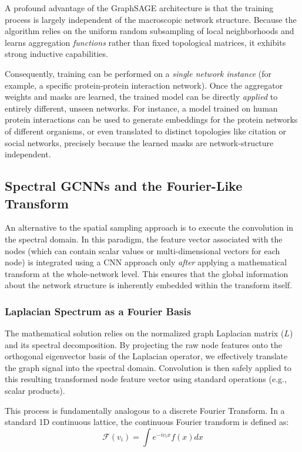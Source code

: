 A profound advantage of the GraphSAGE architecture is that the training process is largely independent of the macroscopic network structure. Because the algorithm relies on the uniform random subsampling of local neighborhoods and learns aggregation \textit{functions} rather than fixed topological matrices, it exhibits strong inductive capabilities.

Consequently, training can be performed on a \textit{single network instance} (for example, a specific protein-protein interaction network). Once the aggregator weights and masks are learned, the trained model can be directly \textit{applied} to entirely different, unseen networks. For instance, a model trained on human protein interactions can be used to generate embeddings for the protein networks of different organisms, or even translated to distinct topologies like citation or social networks, precisely because the learned masks are network-structure independent.

\subsection{Spectral GCNNs and the Fourier-Like Transform}
\label{subsec:spectral_gcnns}

An alternative to the spatial sampling approach is to execute the convolution in the spectral domain. In this paradigm, the feature vector associated with the nodes (which can contain scalar values or multi-dimensional vectors for each node) is integrated using a CNN approach only \textit{after} applying a mathematical transform at the whole-network level. This ensures that the global information about the network structure is inherently embedded within the transform itself.

\subsubsection{Laplacian Spectrum as a Fourier Basis}

The mathematical solution relies on the normalized graph Laplacian matrix ($L$) and its spectral decomposition. By projecting the raw node features onto the orthogonal eigenvector basis of the Laplacian operator, we effectively translate the graph signal into the spectral domain. Convolution is then safely applied to this resulting transformed node feature vector using standard operations (e.g., scalar products).

This process is fundamentally analogous to a discrete Fourier Transform. In a standard 1D continuous lattice, the continuous Fourier transform is defined as:
$$\mathcal{F}(v_i) = \int e^{-iv_i x} f(x) dx$$

